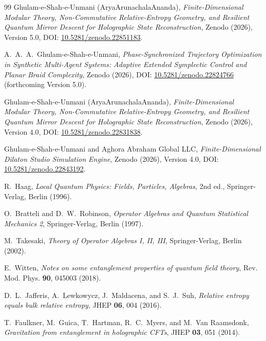 \documentclass[11pt,a4paper]{article}
\theoremstyle{plain}
\theoremstyle{definition}
\begin{document}
\begin{thebibliography}{99}
Ghulam-e-Shah-e-Unmani (AryaArunachalaAnanda),
\textit{Finite-Dimensional Modular Theory, Non-Commutative Relative-Entropy Geometry, and Resilient Quantum Mirror Descent for Holographic State Reconstruction},
Zenodo (2026), Version 5.0, DOI: \href{https://doi.org/10.5281/zenodo.22851183}{10.5281/zenodo.22851183}.

A.~A.~A.~Ghulam-e-Shah-e-Unmani,
\textit{Phase-Synchronized Trajectory Optimization in Synthetic Multi-Agent Systems: Adaptive Extended Symplectic Control and Planar Braid Complexity},
Zenodo (2026), DOI: \href{https://doi.org/10.5281/zenodo.22824766}{10.5281/zenodo.22824766} (forthcoming Version 5.0).

Ghulam-e-Shah-e-Unmani (AryaArunachalaAnanda),
\textit{Finite-Dimensional Modular Theory, Non-Commutative Relative-Entropy Geometry, and Resilient Quantum Mirror Descent for Holographic State Reconstruction},
Zenodo (2026), Version 4.0, DOI: \href{https://doi.org/10.5281/zenodo.22831838}{10.5281/zenodo.22831838}.

Ghulam-e-Shah-e-Unmani and Aghora Abraham Global LLC,
\textit{Finite-Dimensional Dilaton Studio Simulation Engine},
Zenodo (2026), Version 4.0, DOI: \href{https://doi.org/10.5281/zenodo.22843192}{10.5281/zenodo.22843192}.

R.~Haag, \textit{Local Quantum Physics: Fields, Particles, Algebras}, 2nd ed., Springer-Verlag, Berlin (1996).

O.~Bratteli and D.~W.~Robinson, \textit{Operator Algebras and Quantum Statistical Mechanics 2}, Springer-Verlag, Berlin (1997).

M.~Takesaki, \textit{Theory of Operator Algebras I, II, III}, Springer-Verlag, Berlin (2002).

E.~Witten, \textit{Notes on some entanglement properties of quantum field theory}, Rev. Mod. Phys. \textbf{90}, 045003 (2018).

D.~L.~Jafferis, A.~Lewkowycz, J.~Maldacena, and S.~J.~Suh, \textit{Relative entropy equals bulk relative entropy}, JHEP \textbf{06}, 004 (2016).

T.~Faulkner, M.~Guica, T.~Hartman, R.~C.~Myers, and M.~Van Raamsdonk, \textit{Gravitation from entanglement in holographic CFTs}, JHEP \textbf{03}, 051 (2014).


\end{thebibliography}
\end{document}
